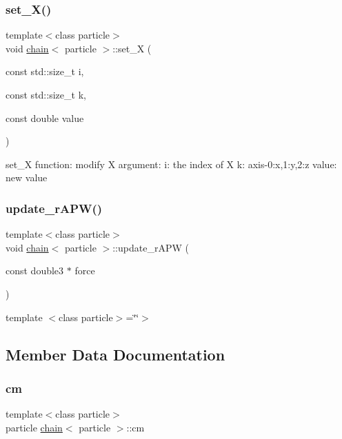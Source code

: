 \subsubsection{\texorpdfstring{set\+\_\+\+X()}{set\_X()}}
{\footnotesize\ttfamily template$<$class particle$>$ \\
void \hyperlink{classchain}{chain}$<$ particle $>$\+::set\+\_\+X (\begin{DoxyParamCaption}\item[{const std\+::size\+\_\+t}]{i,  }\item[{const std\+::size\+\_\+t}]{k,  }\item[{const double}]{value }\end{DoxyParamCaption})\hspace{0.3cm}{\ttfamily [inline]}}



set\+\_\+X function\+: modify X argument\+: i\+: the index of X k\+: axis-\/0\+:x,1\+:y,2\+:z value\+: new value 

\hypertarget{classchain_ac605b407a47aa202afe6f5bd0a3163ec}{}\label{classchain_ac605b407a47aa202afe6f5bd0a3163ec} 
\subsubsection{\texorpdfstring{update\+\_\+r\+A\+P\+W()}{update\_rAPW()}}
{\footnotesize\ttfamily template$<$class particle$>$ \\
void \hyperlink{classchain}{chain}$<$ particle $>$\+::update\+\_\+r\+A\+PW (\begin{DoxyParamCaption}\item[{const double3 $\ast$}]{force }\end{DoxyParamCaption})\hspace{0.3cm}{\ttfamily [inline]}}



template $<$class particle$>$=\char`\"{}\char`\"{}$>$ 



\subsection{Member Data Documentation}
\hypertarget{classchain_a84dfcd9f0112836152bc6843e8f74505}{}\label{classchain_a84dfcd9f0112836152bc6843e8f74505} 
\subsubsection{\texorpdfstring{cm}{cm}}
{\footnotesize\ttfamily template$<$class particle$>$ \\
particle \hyperlink{classchain}{chain}$<$ particle $>$\+::cm}



